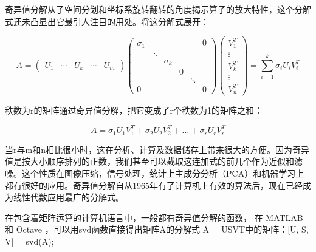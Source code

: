 奇异值分解从子空间分划和坐标系旋转翻转的角度揭示算子的放大特性，这个分解式还未凸显出它最引人注目的用处。将这分解式展开：

\[A = \begin{pmatrix}U_1& \cdots&U_k &\cdots &U_m\end{pmatrix} \begin{pmatrix} \sigma_1 & & & & &0 \\ &\ddots & & & & \\ & &\sigma_k & & & \\ & & &0& & \\ & & & & \ddots & \\0&  & & & &0\end{pmatrix} \begin{pmatrix}V_1^T\\ \vdots \\V_k^T \\ \vdots \\V_n^T \end{pmatrix} = \sum_{i=1}^k \sigma_i U_i V_i^T\]

秩数为r的矩阵通过奇异值分解，把它变成了r个秩数为1的矩阵之和：

\[A=\sigma_1U_1V_1^T +\sigma_2U_2V_2^T+ … +\sigma_rU_rV_r^T\]

当r与m和n相比很小时，这在分析、计算及数据储存上带来很大的方便。因为奇异值是按大小顺序排列的正数，我们甚至可以截取这连加式的前几个作为近似和滤噪。这个性质在图像压缩，信号处理，统计上主成分分析（PCA）和机器学习上都有很好的应用。奇异值分解自从1965年有了计算机上有效的算法后，现在已经成为线性代数应用最广的分解式。

在包含着矩阵运算的计算机语言中，一般都有奇异值分解的函数， 在 MATLAB 和 Octave ，可以用svd函数直接得出矩阵A的分解式 A = USVT中的矩阵：[U, S, V] = svd(A);